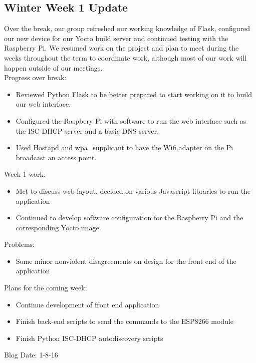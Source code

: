 \subsection{Winter Week 1 Update}
Over the break, our group refreshed our working knowledge of Flask, configured our new device for our Yocto build server and continued testing with the Raspberry Pi. We resumed work on the project and plan to meet during the weeks throughout the term to coordinate work, although most of our work will happen outside of our meetings. \\
Progress over break:
\begin{itemize}
   \item Reviewed Python Flask to be better prepared to start working on it to build our web interface.
   \item Configured the Raspbery Pi with software to run the web interface such as the ISC DHCP server and a basic DNS server.
   \item Used Hostapd and wpa\_supplicant to have the Wifi adapter on the Pi broadcast an access point.
\end{itemize}
Week 1 work:
\begin{itemize}
   \item Met to discuss web layout, decided on various Javascript libraries to run the application
   \item Continued to develop software configuration for the Raspberry Pi and the corresponding Yocto image.
\end{itemize}
Problems:
\begin{itemize}
   \item Some minor nonviolent disagreements on design for the front end of the application
\end{itemize}
Plans for the coming week:
\begin{itemize}
   \item Continue development of front end application
   \item Finish back-end scripts to send the commands to the ESP8266 module
   \item Finish Python ISC-DHCP autodiscovery scripts
\end{itemize}
Blog Date: 1-8-16

